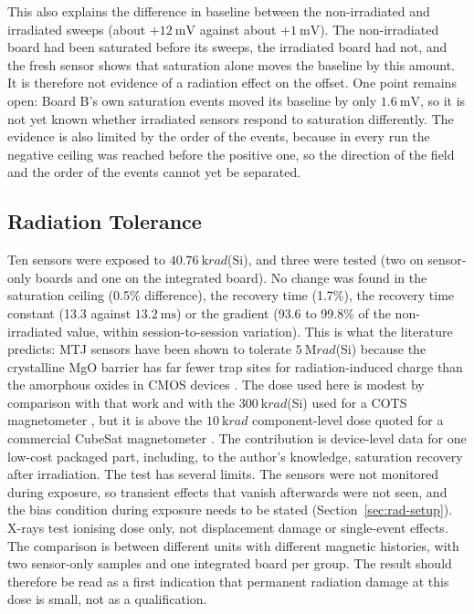 \documentclass[12pt,a4paper]{article}
\begin{document}
This also explains the difference in baseline between the non-irradiated and irradiated sweeps (about $+\SI{12}{\milli\volt}$ against about $+\SI{1}{\milli\volt}$). The non-irradiated board had been saturated before its sweeps, the irradiated board had not, and the fresh sensor shows that saturation alone moves the baseline by this amount. It is therefore not evidence of a radiation effect on the offset. One point remains open: Board B's own saturation events moved its baseline by only $\SI{1.6}{\milli\volt}$, so it is not yet known whether irradiated sensors respond to saturation differently. The evidence is also limited by the order of the events, because in every run the negative ceiling was reached before the positive one, so the direction of the field and the order of the events cannot yet be separated.

\subsection{Radiation Tolerance}
\label{sec:disc-radiation}

Ten sensors were exposed to $\SI{40.76}{\kilo rad}$(Si), and three were tested (two on sensor-only boards and one on the integrated board). No change was found in the saturation ceiling (0.5\% difference), the recovery time (1.7\%), the recovery time constant (13.3 against $\SI{13.2}{\milli\second}$) or the gradient (93.6 to 99.8\% of the non-irradiated value, within session-to-session variation). This is what the literature predicts: MTJ sensors have been shown to tolerate $\SI{5}{\mega rad}$(Si) \cite{tmr-bias-radiation} because the crystalline MgO barrier has far fewer trap sites for radiation-induced charge than the amorphous oxides in CMOS devices \cite{tid-basics-lanl}. The dose used here is modest by comparison with that work and with the $\SI{300}{\kilo rad}$(Si) used for a COTS magnetometer \cite{regoli2020}, but it is above the $\SI{10}{\kilo rad}$ component-level dose quoted for a commercial CubeSat magnetometer \cite{nss_magnetometer}. The contribution is device-level data for one low-cost packaged part, including, to the author's knowledge, saturation recovery after irradiation. The test has several limits. The sensors were not monitored during exposure, so transient effects that vanish afterwards were not seen, and the bias condition during exposure needs to be stated (Section~\ref{sec:rad-setup}). X-rays test ionising dose only, not displacement damage or single-event effects. The comparison is between different units with different magnetic histories, with two sensor-only samples and one integrated board per group. The result should therefore be read as a first indication that permanent radiation damage at this dose is small, not as a qualification.
\end{document}
